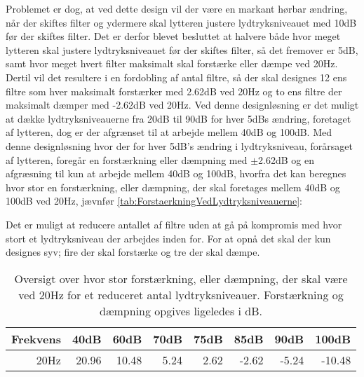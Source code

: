 Problemet er dog, at ved dette design vil der være en markant hørbar ændring, når der skiftes filter og ydermere skal lytteren justere lydtryksniveauet med 10dB før der skiftes filter. Det er derfor blevet besluttet at halvere både hvor meget lytteren skal justere lydtryksniveauet før der skiftes filter, så det fremover er 5dB, samt hvor meget hvert filter maksimalt skal forstærke eller dæmpe ved 20Hz. Dertil vil det resultere i en fordobling af antal filtre, så der skal designes 12 ens filtre som hver maksimalt forstærker med 2.62dB ved 20Hz og to ens filtre der maksimalt dæmper med -2.62dB ved 20Hz. Ved denne designløsning er det muligt at dække lydtryksniveauerne fra 20dB til 90dB for hver 5dBs ændring, foretaget af lytteren, dog er der afgrænset til at arbejde mellem 40dB og 100dB. Med denne designløsning hvor der for hver 5dB's ændring i lydtryksniveau, forårsaget af lytteren, foregår en forstærkning eller dæmpning med $\pm$2.62dB og en afgræsning til kun at arbejde mellem 40dB og 100dB, hvorfra det kan beregnes hvor stor en forstærkning, eller dæmpning, der skal foretages mellem 40dB og 100dB ved 20Hz, jævnfør \autoref{tab:ForstaerkningVedLydtryksniveauerne}: 
%
\begin{table}[H]
\centering
{}
\caption{Oversigt over hvor stor forstærkning, eller dæmpning, der skal være ved 20Hz for de fremsatte lydtryksniveauer. Forstærkning og dæmpning opgives ligeledes i dB.}
\label{tab:ForstaerkningVedLydtryksniveauerne}
\end{table}
\noindent
%
Det er muligt at reducere antallet af filtre uden at gå på kompromis med hvor stort et lydtryksniveau der arbejdes inden for. For at opnå det skal der kun designes syv; fire der skal forstærke og tre der skal dæmpe. 
%
\begin{table}[H]
\centering
\begin{tabular}{|r|r|r|r|r|r|r|r|}
\hline
\multicolumn{1}{|l|}{Frekvens} & \multicolumn{1}{l|}{40dB} &  \multicolumn{1}{l|}{60dB} & \multicolumn{1}{l|}{70dB} & \multicolumn{1}{l|}{75dB} & \multicolumn{1}{l|}{85dB} & \multicolumn{1}{l|}{90dB}  & \multicolumn{1}{l|}{100dB}\\ \hline
20Hz & 20.96 & 10.48 & 5.24 & 2.62 & -2.62 & -5.24 & -10.48 \\ \hline
\end{tabular}
\caption{Oversigt over hvor stor forstærkning, eller dæmpning, der skal være ved 20Hz for et reduceret antal lydtryksniveauer. Forstærkning og dæmpning opgives ligeledes i dB.}
\label{tab:ForstaerkningTilDeSyvFiltre}
\end{table}
